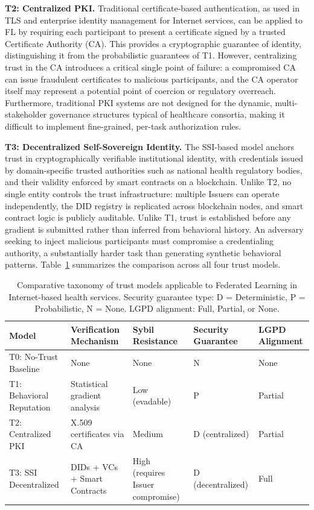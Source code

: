 \documentclass{sbc2023}
\begin{document}
\textbf{T2: Centralized PKI.} Traditional certificate-based authentication, as used in TLS and enterprise identity management for Internet services, can be applied to FL by requiring each participant to present a certificate signed by a trusted Certificate Authority (CA). This provides a cryptographic guarantee of identity, distinguishing it from the probabilistic guarantees of T1. However, centralizing trust in the CA introduces a critical single point of failure: a compromised CA can issue fraudulent certificates to malicious participants, and the CA operator itself may represent a potential point of coercion or regulatory overreach. Furthermore, traditional PKI systems are not designed for the dynamic, multi-stakeholder governance structures typical of healthcare consortia, making it difficult to implement fine-grained, per-task authorization rules.

\textbf{T3: Decentralized Self-Sovereign Identity.} The SSI-based model anchors trust in cryptographically verifiable institutional identity, with credentials issued by domain-specific trusted authorities such as national health regulatory bodies, and their validity enforced by smart contracts on a blockchain. Unlike T2, no single entity controls the trust infrastructure: multiple Issuers can operate independently, the DID registry is replicated across blockchain nodes, and smart contract logic is publicly auditable. Unlike T1, trust is established before any gradient is submitted rather than inferred from behavioral history. An adversary seeking to inject malicious participants must compromise a credentialing authority, a substantially harder task than generating synthetic behavioral patterns. Table~\ref{tab:taxonomy} summarizes the comparison across all four trust models.

\begin{table}[!ht]
\caption{Comparative taxonomy of trust models applicable to Federated Learning in Internet-based health services. Security guarantee type: D = Deterministic, P = Probabilistic, N = None. LGPD alignment: Full, Partial, or None.}
\label{tab:taxonomy}
\centering
\begin{tabularx}{\textwidth}{lXXXX}
\toprule
\textbf{Model} & \textbf{Verification Mechanism} & \textbf{Sybil Resistance} & \textbf{Security Guarantee} & \textbf{LGPD Alignment} \\
\midrule
T0: No-Trust Baseline & None & None & N & None \\
T1: Behavioral Reputation & Statistical gradient analysis & Low (evadable) & P & Partial \\
T2: Centralized PKI & X.509 certificates via CA & Medium & D (centralized) & Partial \\
T3: SSI Decentralized & DIDs + VCs + Smart Contracts & High (requires Issuer compromise) & D (decentralized) & Full \\
\bottomrule
\end{tabularx}
\end{table}
\end{document}
